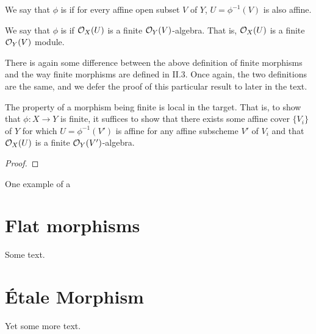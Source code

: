 \begin{defn}
We say that $\phi$ is  if for every 
affine open subset $V$ of $Y$, $U = \phi^{-1}(V)$ is also affine.

We say that $\phi$ is  if 
$\mathcal{O}_X(U)$ is a finite $\mathcal{O}_Y(V)$-algebra. That is, $\mathcal{O}_X(U)$ is
a finite $\mathcal{O}_Y(V)$ module.
\end{defn}

There is again some difference between the above definition of
finite morphisms and the way finite morphisms are defined in 
\cite{Hart} II.3. Once again, the two definitions are the same, 
and we defer the proof of this particular result to later in the 
text.

\begin{prop}
The property of a morphism being finite is local in the target.
That is, to show that $\phi: X \to Y$ is finite, it suffices to
show that there exists some affine cover $\{V_i\}$ of $Y$ for 
which $U = \phi^{-1}(V')$ is affine for any affine subscheme $V'$ 
of $V_i$ and that $\mathcal{O}_X(U)$ is a finite $\mathcal{O}_Y(V')$-algebra.
\end{prop}
\begin{proof}

\end{proof}

One example of a 

\section{Flat morphisms}

Some text.

\section{\'Etale Morphism}

Yet some more text.
